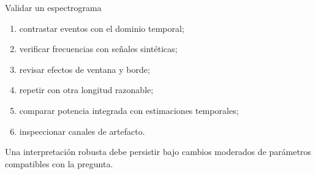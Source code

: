 \documentclass[
  ignorenonframetext,
  aspectratio=169,
  spanish,
]{beamer}
\providecommand{\tightlist}{%
  \setlength{\itemsep}{0pt}\setlength{\parskip}{0pt}}
\begin{document}
\begin{frame}{Validar un espectrograma}
  \protect{}\label{validar-un-espectrograma}
  \begin{enumerate}
    \tightlist
    \item
          contrastar eventos con el dominio temporal;
    \item
          verificar frecuencias con señales sintéticas;
    \item
          revisar efectos de ventana y borde;
    \item
          repetir con otra longitud razonable;
    \item
          comparar potencia integrada con estimaciones temporales;
    \item
          inspeccionar canales de artefacto.
  \end{enumerate}

  \begin{tcolorbox}[enhanced jigsaw, arc=.35mm, bottomrule=.15mm, bottomtitle=1mm, breakable, colback=white, colbacktitle=quarto-callout-tip-color!10!white, colframe=quarto-callout-tip-color-frame, coltitle=black, left=2mm, leftrule=.75mm, opacityback=0, opacitybacktitle=0.6, rightrule=.15mm, title=\textcolor{quarto-callout-tip-color}{\faLightbulb}\hspace{0.5em}{Tip}, titlerule=0mm, toprule=.15mm, toptitle=1mm]

    Una interpretación robusta debe persistir bajo cambios moderados de
    parámetros compatibles con la pregunta.

  \end{tcolorbox}
\end{frame}
\end{document}
